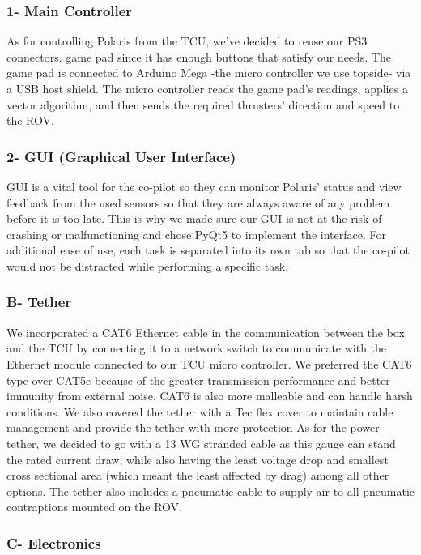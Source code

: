 \documentclass[a4paper,12pt,leqno]{report}
\begin{document}
\textcolor{orange!90}{
\subsubsection{1- Main Controller}}
As for controlling Polaris from the TCU, we’ve decided to reuse our PS3 connectors. 
game pad since it has enough buttons that satisfy our needs. The game pad is connected to Arduino Mega -the micro controller we use  topside- via a USB host shield. The micro controller reads the game pad’s readings, applies a vector algorithm, and then sends the required  thrusters’ direction and speed to the ROV.\\
\textcolor{orange!90}{
\subsubsection{2- GUI (Graphical User Interface) }}
GUI is a vital tool for the co-pilot so they can monitor Polaris’ status and view feedback from the used sensors so that they are always  aware of any problem before it is too late. This is why we made sure  our GUI is not at the risk of crashing or malfunctioning and chose  PyQt5 to implement the interface. For additional ease of use, each  task is separated into its own tab so that the co-pilot would not be  distracted while performing a specific task. 
\\
\textcolor{blue!40}{
\subsubsection{B- Tether}}
We incorporated a CAT6 Ethernet cable in the communication between the box and the TCU by connecting it to a network switch to communicate with the Ethernet module connected to our TCU micro controller. We preferred the CAT6 type over CAT5e because of the greater transmission performance and better immunity from external noise. CAT6 is also more malleable and can handle harsh conditions. We also covered the tether with a Tec flex cover to maintain cable management and provide the tether with more  protection As for the power tether, we decided to go with a 13 WG stranded cable as this gauge can  stand the rated current draw, while also having the least voltage drop and smallest cross sectional area (which meant the least affected by drag) among all other options.
The tether also includes a pneumatic cable to supply air to all pneumatic contraptions mounted  on the ROV. \\
\textcolor{blue!40}{
\subsubsection{C- Electronics}}
\end{document}
